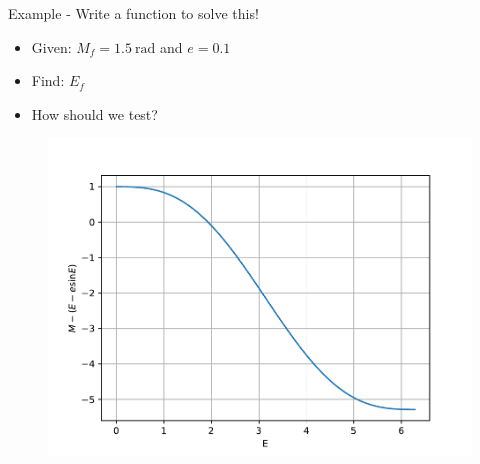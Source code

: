 \documentclass[11pt,professionalfonts]{beamer}
\begin{document}
\begin{frame}{Example - Write a function to solve this!}
    \begin{itemize}
        \item Given: \( M_f = \SI{1.5}{\radian} \) and \( e = 0.1 \)
        \item Find: \( E_f\)
        \item How should we test?
    \end{itemize}
    \begin{figure}
        \centering
        \includegraphics[width=\textwidth,height=0.7\textheight,keepaspectratio]{figures/kepler_eq.pdf}
    \end{figure}
\end{frame}
\end{document}
